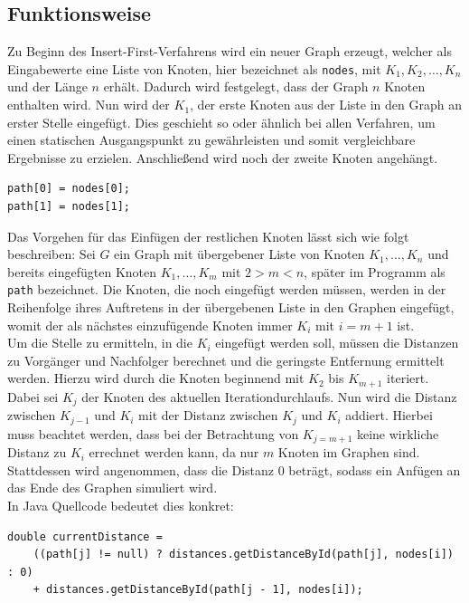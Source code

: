 \subsection{Funktionsweise}
Zu Beginn des Insert-First-Verfahrens wird ein neuer Graph erzeugt, welcher als Eingabewerte eine Liste von Knoten, hier bezeichnet als \lstinline{nodes}, mit $K_1, K_2,  \ldots ,K_n$ und der Länge $n$ erhält. 
Dadurch wird festgelegt, dass der Graph $n$ Knoten enthalten wird.
Nun wird der $K_1$, der erste Knoten aus der Liste in den Graph an erster Stelle eingefügt. 
Dies geschieht so oder ähnlich bei allen Verfahren, um einen statischen Ausgangspunkt zu gewährleisten und somit vergleichbare Ergebnisse zu erzielen.
Anschließend wird noch der zweite Knoten angehängt.
\begin{lstlisting}[caption={Zuweisung des ersten und zweiten Knotens}]
path[0] = nodes[0];
path[1] = nodes[1];  
\end{lstlisting}
Das Vorgehen für das Einfügen der restlichen Knoten lässt sich wie folgt beschreiben: 
Sei $G$ ein Graph mit übergebener Liste von Knoten  $K_1,\ldots,K_n$ und bereits eingefügten Knoten $K_1,\ldots,K_m$ mit $2 > m < n$, später im Programm als \lstinline{path} bezeichnet. 
Die Knoten, die noch eingefügt werden müssen, werden in der Reihenfolge ihres Auftretens in der übergebenen Liste in den Graphen eingefügt, womit der als nächstes einzufügende Knoten immer $K_{i}$ mit $i = m + 1$ ist.
\\
Um die Stelle zu ermitteln, in die $K_i$ eingefügt werden soll, müssen die Distanzen zu Vorgänger und Nachfolger berechnet und die geringste Entfernung ermittelt werden. 
Hierzu wird durch die Knoten beginnend mit $K_2$ bis $K_{m+1}$ iteriert. Dabei sei $K_j$ der Knoten des aktuellen Iterationdurchlaufs. 
Nun wird die Distanz zwischen $K_{j-1}$ und $K_i$ mit der Distanz zwischen  $K_{j}$ und $K_i$ addiert. Hierbei muss beachtet werden, dass bei der Betrachtung von $K_{j=m+1}$ keine wirkliche Distanz zu $K_i$ errechnet werden kann, da nur $m$ Knoten im Graphen sind. Stattdessen wird angenommen, dass die Distanz 0 beträgt, sodass ein Anfügen an das Ende des Graphen simuliert wird.
\\
In Java Quellcode bedeutet dies konkret:
\begin{lstlisting}[caption={Ermittlung der Distanzen}, label={lst:distjava}]
double currentDistance = 
    ((path[j] != null) ? distances.getDistanceById(path[j], nodes[i]) : 0)
    + distances.getDistanceById(path[j - 1], nodes[i]);

\end{lstlisting}
